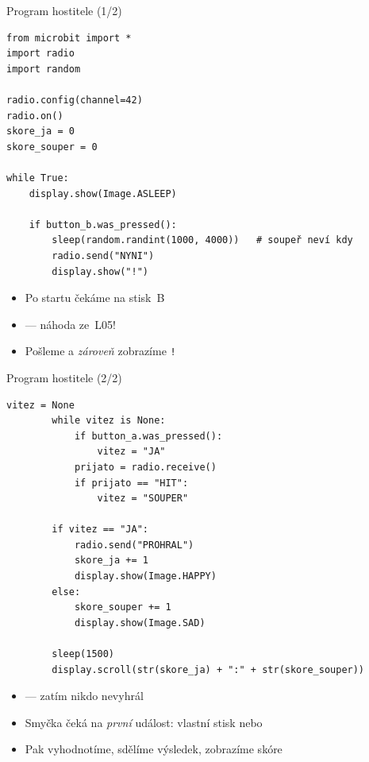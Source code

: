 \begin{frame}[fragile]{Program hostitele (1/2)}

\begin{lstlisting}[basicstyle=\tiny\ttfamily]
from microbit import *
import radio
import random

radio.config(channel=42)
radio.on()
skore_ja = 0
skore_souper = 0

while True:
    display.show(Image.ASLEEP)

    if button_b.was_pressed():
        sleep(random.randint(1000, 4000))   # soupeř neví kdy
        radio.send("NYNI")
        display.show("!")
\end{lstlisting}

  \begin{itemize}
    \item Po startu čekáme na stisk~B
    \item {} — náhoda ze~L05!
    \item Pošleme  a \emph{zároveň} zobrazíme \texttt{!}
  \end{itemize}

\end{frame}

\begin{frame}[fragile]{Program hostitele (2/2)}

\begin{lstlisting}[basicstyle=\tiny\ttfamily]
        vitez = None
        while vitez is None:
            if button_a.was_pressed():
                vitez = "JA"
            prijato = radio.receive()
            if prijato == "HIT":
                vitez = "SOUPER"

        if vitez == "JA":
            radio.send("PROHRAL")
            skore_ja += 1
            display.show(Image.HAPPY)
        else:
            skore_souper += 1
            display.show(Image.SAD)

        sleep(1500)
        display.scroll(str(skore_ja) + ":" + str(skore_souper))
\end{lstlisting}

  \begin{itemize}
    \item {} — zatím nikdo nevyhrál
    \item Smyčka čeká na \emph{první} událost: vlastní stisk nebo 
    \item Pak vyhodnotíme, sdělíme výsledek, zobrazíme skóre
  \end{itemize}

\end{frame}

